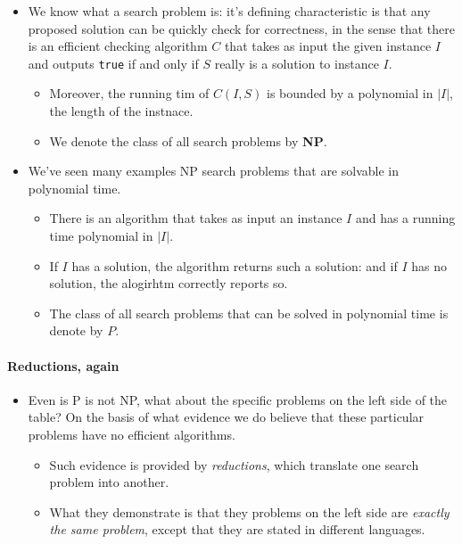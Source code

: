 \documentclass[a4paper,11pt]{article}
\begin{document}
\begin{itemize}
\itemsep1pt\parskip0pt
\item
  We know what a search problem is: it's defining characteristic is that
  any proposed solution can be quickly check for correctness, in the
  sense that there is an efficient checking algorithm $C$ that takes as
  input the given instance $I$ and outputs \texttt{true} if and only if
  $S$ really is a solution to instance $I$.

  \begin{itemize}
  \itemsep1pt\parskip0pt
  \item
    Moreover, the running tim of $C(I, S)$ is bounded by a polynomial in
    $|I|$, the length of the instnace.
  \item
    We denote the class of all search problems by \textbf{NP}.
  \end{itemize}
\item
  We've seen many examples NP search problems that are solvable in
  polynomial time.

  \begin{itemize}
  \itemsep1pt\parskip0pt
  \item
    There is an algorithm that takes as input an instance $I$ and has a
    running time polynomial in $|I|$.
  \item
    If $I$ has a solution, the algorithm returns such a solution: and if
    $I$ has no solution, the alogirhtm correctly reports so.
  \item
    The class of all search problems that can be solved in polynomial
    time is denote by $P$.
  \end{itemize}
\end{itemize}

\paragraph{Reductions, again}\label{reductions-again}

\begin{itemize}
\itemsep1pt\parskip0pt
\item
  Even is P is not NP, what about the specific problems on the left side
  of the table? On the basis of what evidence we do believe that these
  particular problems have no efficient algorithms.

  \begin{itemize}
  \itemsep1pt\parskip0pt
  \item
    Such evidence is provided by \emph{reductions}, which translate one
    search problem into another.
  \item
    What they demonstrate is that they problems on the left side are
    \emph{exactly the same problem}, except that they are stated in
    different languages.
  \end{itemize}
\end{itemize}
\end{document}
